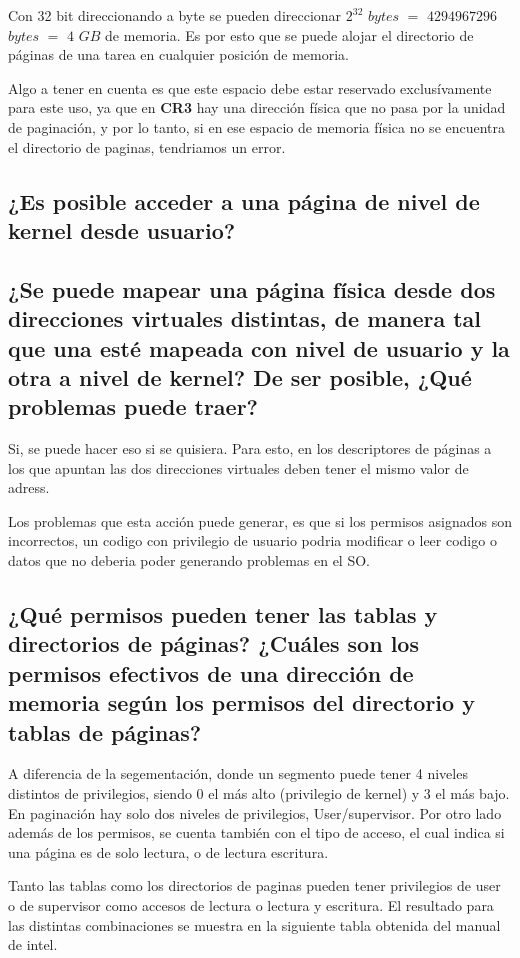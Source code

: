 \documentclass[a4paper,10pt,twoside]{article}
\begin{document}
Con 32 bit direccionando a byte se pueden direccionar $2^{32}$ $bytes$ $=$ $4294967296$ $bytes$ $=$ $4$ $GB$ de memoria. Es por esto que se puede alojar el directorio de páginas de una tarea en cualquier posición de memoria. 

Algo a tener en cuenta es que este espacio debe estar reservado exclusívamente para este uso, ya que en \textbf{CR3} hay una dirección física que no pasa por la unidad de paginación, y por lo tanto, si en ese espacio de memoria física no se encuentra el directorio de paginas, tendriamos un error.

\subsection{¿Es posible acceder a una página de nivel de kernel desde usuario?}

\subsection{¿Se puede mapear una página física desde dos direcciones virtuales distintas, de manera tal que una esté mapeada con nivel de usuario y la otra a nivel de kernel? De ser posible, ¿Qué problemas puede traer?}
Si, se puede hacer eso si se quisiera. Para esto, en los descriptores de páginas a los que apuntan las dos direcciones virtuales deben tener el mismo valor de adress.

Los problemas que esta acción puede generar, es que si los permisos asignados son incorrectos, un codigo con privilegio de usuario podria modificar o leer codigo o datos que no deberia poder generando problemas en el SO.

\subsection{¿Qué permisos pueden tener las tablas y directorios de páginas? ¿Cuáles
son los permisos efectivos de una dirección de memoria según los permisos del directorio
y tablas de páginas?}
A diferencia de la segementación, donde un segmento puede tener 4 niveles distintos de privilegios, siendo 0 el más alto (privilegio de kernel) y 3 el más bajo. En paginación hay solo dos niveles de privilegios, User/supervisor. Por otro lado además de los permisos, se cuenta también con el tipo de acceso, el cual indica si una página es de solo lectura, o de lectura escritura.

Tanto las tablas como los directorios de paginas pueden tener privilegios de user o de supervisor como accesos de lectura o lectura y escritura. El resultado para las distintas combinaciones se muestra en la siguiente tabla obtenida del manual de intel.
\end{document}

